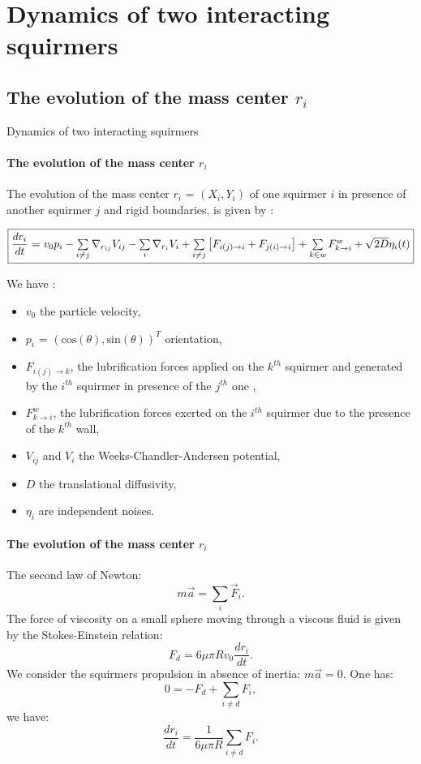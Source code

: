 \documentclass{beamer}
\begin{document}
\section{Dynamics of two interacting squirmers}
\subsection{The evolution of the mass center $r_i$}    
\begin{frame}{Dynamics of two interacting squirmers}
        \framesubtitle{The evolution of the mass center $r_i$}
        The evolution of the mass center $r_i$ = $(X_i, Y_i)$ of one squirmer $i$ in presence of 
    another squirmer $j$ and rigid boundaries, is given by :
    \begin{center}
        \footnotesize
        $\boxed{\frac{dr_i}{dt}$ = $v_0 p_i -  \sum\limits_{i \ne j}\nabla_{r_{ij}} V_{ij} - \sum\limits_{i}\nabla_{r_i} V_i + \sum\limits_{i\ne j}\left[F_{i(j)\rightarrow i} + F_{j(i)\rightarrow i}\right]+ \sum\limits_{k \in w}F_{k\rightarrow i}^w + \sqrt{2D}\eta_i(t)}$
    \end{center}
    \normalsize
    We have : \begin{itemize}
        \item $v_0$ the particle velocity,
    \item $p_i$ = $(\mathrm{cos}(\theta),\mathrm{sin}(\theta))^T$ orientation,
    \item $F_{i(j)\rightarrow k}$, the lubrification forces applied on the $k^{th}$ squirmer and generated by the $i^{th}$ squirmer in presence of the $j^{th}$ one \cite{Brumley},
    \item $F^w_{k\rightarrow i}$, the lubrification forces exerted on the $i^{th}$ squirmer due to the presence of the $k^{th}$ wall\cite{Brumley},
    \item $V_{ij}$ and $V_i$ the Weeks-Chandler-Andersen potential,
    \item $D$ the translational diffusivity,
    \item $\eta_i$ are independent noises. 
    \end{itemize}
\end{frame}

\begin{frame}
    \framesubtitle{The evolution of the mass center $r_i$}
    The second law of Newton\cite{Newton}:
    $$m\vec{a} = \sum\limits_i \vec{F}_i.$$
    The force of viscosity on a small sphere moving through a viscous fluid is given by the Stokes-Einstein relation\cite{Stokes}:
    $$F_d = 6\mu\pi Rv_0\frac{dr_i}{dt}.$$
    We consider the squirmers propulsion in absence of inertia: $m\vec{a} = 0$. One has:
    $$0 = -F_d + \sum\limits_{i \ne d} F_i,$$
    we have:
    $$\frac{dr_i}{dt} = \frac{1}{6\mu\pi R}\sum\limits_{i \ne d} F_i.$$
\end{frame}
    
\end{document}
